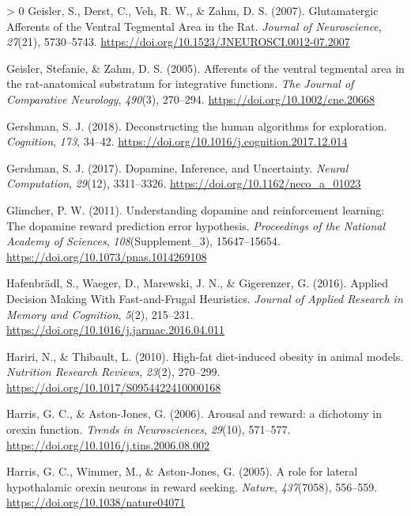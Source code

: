 \documentclass[
]{/home/nicoluarte/Downloads/templates/PNAS-template-main.tex}
\newlength{\cslhangindent}
\newenvironment{CSLReferences}[3] %
 {%
  \setlength{\parindent}{0pt}
  \ifodd #1 \everypar{\setlength{\hangindent}{\cslhangindent}}\ignorespaces\fi
  \ifnum #2 > 0
  \setlength{\parskip}{#2\baselineskip}
  \fi
 }%
 {}
\begin{document}
\begin{CSLReferences}{1}{0}
\leavevmode\hypertarget{ref-S3LMSWG5}{}%
Geisler, S., Derst, C., Veh, R. W., \& Zahm, D. S. (2007). Glutamatergic
Afferents of the Ventral Tegmental Area in the Rat. \emph{Journal of
Neuroscience}, \emph{27}(21), 5730--5743.
\url{https://doi.org/10.1523/JNEUROSCI.0012-07.2007}

\leavevmode\hypertarget{ref-SC7QH8NN}{}%
Geisler, Stefanie, \& Zahm, D. S. (2005). Afferents of the ventral
tegmental area in the rat-anatomical substratum for integrative
functions. \emph{The Journal of Comparative Neurology}, \emph{490}(3),
270--294. \url{https://doi.org/10.1002/cne.20668}

\leavevmode\hypertarget{ref-LFIY67XG}{}%
Gershman, S. J. (2018). Deconstructing the human algorithms for
exploration. \emph{Cognition}, \emph{173}, 34--42.
\url{https://doi.org/10.1016/j.cognition.2017.12.014}

\leavevmode\hypertarget{ref-SZZJ3VQF}{}%
Gershman, S. J. (2017). Dopamine, Inference, and Uncertainty.
\emph{Neural Computation}, \emph{29}(12), 3311--3326.
\url{https://doi.org/10.1162/neco_a_01023}

\leavevmode\hypertarget{ref-R3TZXYBW}{}%
Glimcher, P. W. (2011). Understanding dopamine and reinforcement
learning: The dopamine reward prediction error hypothesis.
\emph{Proceedings of the National Academy of Sciences},
\emph{108}(Supplement\_3), 15647--15654.
\url{https://doi.org/10.1073/pnas.1014269108}

\leavevmode\hypertarget{ref-J7XQF8LY}{}%
Hafenbrädl, S., Waeger, D., Marewski, J. N., \& Gigerenzer, G. (2016).
Applied Decision Making With Fast-and-Frugal Heuristics. \emph{Journal
of Applied Research in Memory and Cognition}, \emph{5}(2), 215--231.
\url{https://doi.org/10.1016/j.jarmac.2016.04.011}

\leavevmode\hypertarget{ref-C6PMZNGR}{}%
Hariri, N., \& Thibault, L. (2010). High-fat diet-induced obesity in
animal models. \emph{Nutrition Research Reviews}, \emph{23}(2),
270--299. \url{https://doi.org/10.1017/S0954422410000168}

\leavevmode\hypertarget{ref-TUU47UNG}{}%
Harris, G. C., \& Aston-Jones, G. (2006). Arousal and reward: a
dichotomy in orexin function. \emph{Trends in Neurosciences},
\emph{29}(10), 571--577.
\url{https://doi.org/10.1016/j.tins.2006.08.002}

\leavevmode\hypertarget{ref-S6TNU7XM}{}%
Harris, G. C., Wimmer, M., \& Aston-Jones, G. (2005). A role for lateral
hypothalamic orexin neurons in reward seeking. \emph{Nature},
\emph{437}(7058), 556--559. \url{https://doi.org/10.1038/nature04071}


\end{CSLReferences}
\end{document}
